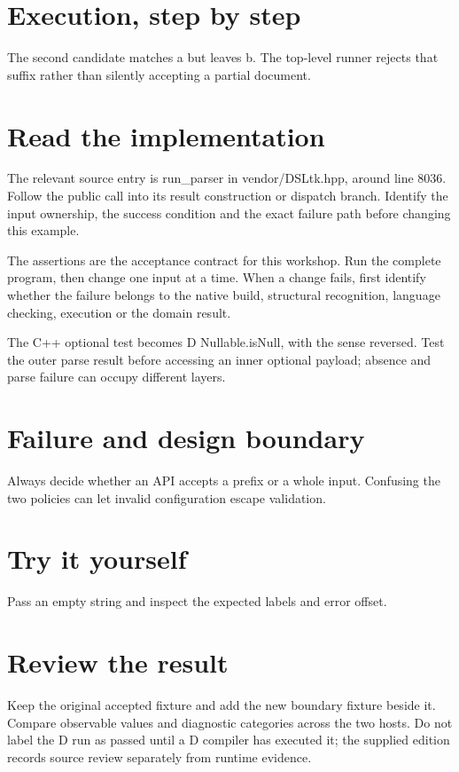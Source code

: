 
\section*{Execution, step by step}
The second candidate matches a but leaves b. The top-level runner rejects that suffix rather than silently accepting a partial document.

\section*{Read the implementation}
The relevant source entry is run\_parser in vendor/DSLtk.hpp, around line 8036. Follow the public call into its result construction or dispatch branch. Identify the input ownership, the success condition and the exact failure path before changing this example.

The assertions are the acceptance contract for this workshop. Run the complete program, then change one input at a time. When a change fails, first identify whether the failure belongs to the native build, structural recognition, language checking, execution or the domain result.

\clearpage
{}
The C++ optional test becomes D Nullable.isNull, with the sense reversed. Test the outer parse result before accessing an inner optional payload; absence and parse failure can occupy different layers.


\section*{Failure and design boundary}
Always decide whether an API accepts a prefix or a whole input. Confusing the two policies can let invalid configuration escape validation.

\section*{Try it yourself}
Pass an empty string and inspect the expected labels and error offset.

\section*{Review the result}
Keep the original accepted fixture and add the new boundary fixture beside it. Compare observable values and diagnostic categories across the two hosts. Do not label the D run as passed until a D compiler has executed it; the supplied edition records source review separately from runtime evidence.

